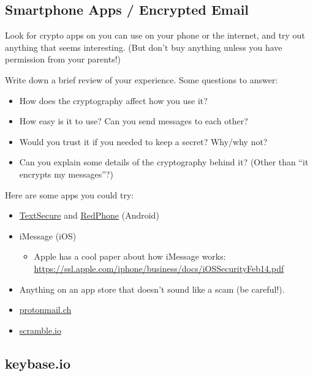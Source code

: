 \documentclass[12pt]{article}
\begin{document}
\subsection*{Smartphone Apps / Encrypted Email}

Look for crypto apps on you can use on your phone or the internet, and try out anything that seems interesting. (But don't buy anything unless you have permission from your parents!)

Write down a brief review of your experience. Some questions to answer:

\begin{itemize}
\item How does the cryptography affect how you use it?
\item How easy is it to use? Can you send messages to each other?
\item Would you trust it if you needed to keep a secret? Why/why not?
\item Can you explain some details of the cryptography behind it? (Other than ``it encrypts my messages''?)
\end{itemize}



\vspace{2em}
Here are some apps you could try:

\begin{itemize}
\item \href{https://whispersystems.org/}{TextSecure} and \href{https://whispersystems.org/}{RedPhone} (Android)
\item iMessage (iOS)
\begin{itemize}
\item Apple has a cool paper about how iMessage works:\\\href{https://ssl.apple.com/iphone/business/docs/iOS_Security_Feb14.pdf}{https://ssl.apple.com/iphone/business/docs/iOS{\textunderscore}Security{\textunderscore}Feb14.pdf}
\end{itemize}
\item Anything on an app store that doesn't sound like a scam (be careful!).
\item \href{https://protonmail.ch/}{protonmail.ch}
\item \href{https://protonmail.ch/}{scramble.io}
\end{itemize}



\subsection*{keybase.io}
\end{document}
